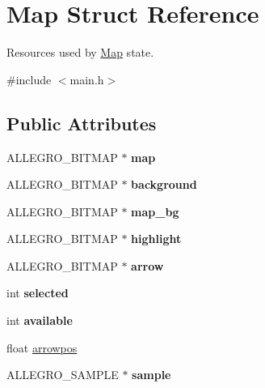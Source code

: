 \hypertarget{structMap}{\section{\-Map \-Struct \-Reference}
\label{structMap}
}


\-Resources used by \hyperlink{structMap}{\-Map} state.  




{\ttfamily \#include $<$main.\-h$>$}

\subsection*{\-Public \-Attributes}
\begin{DoxyCompactItemize}
\item 
\hypertarget{structMap_abaf70186fbb2b4b047b8350e3ec5347c}{\-A\-L\-L\-E\-G\-R\-O\-\_\-\-B\-I\-T\-M\-A\-P $\ast$ {\bfseries map}}\label{structMap_abaf70186fbb2b4b047b8350e3ec5347c}

\item 
\hypertarget{structMap_ae4d43e7eb0694d06b3eea8552fe68ea2}{\-A\-L\-L\-E\-G\-R\-O\-\_\-\-B\-I\-T\-M\-A\-P $\ast$ {\bfseries background}}\label{structMap_ae4d43e7eb0694d06b3eea8552fe68ea2}

\item 
\hypertarget{structMap_ac0b084971832b4466a9d91233452378d}{\-A\-L\-L\-E\-G\-R\-O\-\_\-\-B\-I\-T\-M\-A\-P $\ast$ {\bfseries map\-\_\-bg}}\label{structMap_ac0b084971832b4466a9d91233452378d}

\item 
\hypertarget{structMap_a703b41e358b7c8ff39bf0d8dd37bb408}{\-A\-L\-L\-E\-G\-R\-O\-\_\-\-B\-I\-T\-M\-A\-P $\ast$ {\bfseries highlight}}\label{structMap_a703b41e358b7c8ff39bf0d8dd37bb408}

\item 
\hypertarget{structMap_a607f79d7c594540ebf58f88fb999250d}{\-A\-L\-L\-E\-G\-R\-O\-\_\-\-B\-I\-T\-M\-A\-P $\ast$ {\bfseries arrow}}\label{structMap_a607f79d7c594540ebf58f88fb999250d}

\item 
\hypertarget{structMap_a07b3269191a003d517977da3adc7f0a4}{int {\bfseries selected}}\label{structMap_a07b3269191a003d517977da3adc7f0a4}

\item 
\hypertarget{structMap_aa000e129cf19d6d6d9a78cfce0ef58fc}{int {\bfseries available}}\label{structMap_aa000e129cf19d6d6d9a78cfce0ef58fc}

\item 
float \hyperlink{structMap_a4f395f7bdf7bc0782e29e996e87237bb}{arrowpos}
\item 
\hypertarget{structMap_a3334bc47109df8757b77c9d3bf67ec5f}{\-A\-L\-L\-E\-G\-R\-O\-\_\-\-S\-A\-M\-P\-L\-E $\ast$ {\bfseries sample}}\label{structMap_a3334bc47109df8757b77c9d3bf67ec5f}


\end{DoxyCompactItemize}
